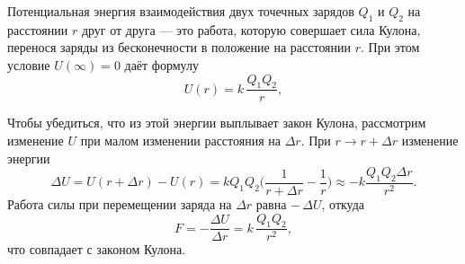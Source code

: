 \documentclass[12pt, a4paper]{article}%
\begin{document}
Потенциальная энергия взаимодействия двух точечных зарядов $Q_{1}$ и $Q_{2}$ на расстоянии $r$ друг от друга — это работа, которую совершает сила Кулона, перенося заряды из бесконечности в положение на расстоянии $r$. При этом условие $U(\infty)=0$ даёт формулу
\[
U(r)=k\,\frac{Q_{1}Q_{2}}{r},
\]

Чтобы убедиться, что из этой энергии выплывает закон Кулона, рассмотрим изменение $U$ при малом изменении расстояния на $\Delta r$. При $r\to r+\Delta r$ изменение энергии
\[
\Delta U=U(r+\Delta r)-U(r) = kQ_1Q_2\bigl(\frac{1}{r+\Delta r} - \frac{1}{r}\bigr) \approx -k\frac{Q_1Q_2\Delta r}{r^2}.
\]
Работа силы при перемещении заряда на $\Delta r$ равна $-\,\Delta U$,
откуда
\[
F=-\frac{\Delta U}{\Delta r}=k\,\frac{Q_{1}Q_{2}}{r^{2}},
\]
что совпадает с законом Кулона.
\end{document}
